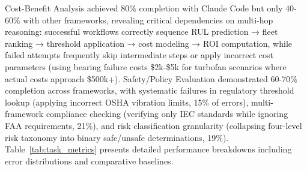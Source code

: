 \documentclass[sigconf,review]{acmart}
\begin{document}
  Cost-Benefit Analysis achieved 80\% completion with Claude Code but only 40-60\% with other frameworks, revealing critical dependencies on multi-hop reasoning:  
  successful workflows correctly sequence RUL prediction → fleet ranking →   
  threshold application → cost modeling → ROI computation, while failed      
  attempts frequently skip intermediate steps or apply incorrect cost        
  parameters (using bearing failure costs \$2k-\$5k for turbofan scenarios   
  where actual costs approach \$500k+). Safety/Policy Evaluation demonstrated
   60-70\% completion across frameworks, with systematic failures in         
  regulatory threshold lookup (applying incorrect OSHA vibration limits, 15\%
   of errors), multi-framework compliance checking (verifying only IEC       
  standards while ignoring FAA requirements, 21\%), and risk classification  
  granularity (collapsing four-level risk taxonomy into binary safe/unsafe   
  determinations, 19\%). Table~\ref{tab:task_metrics} presents detailed performance breakdowns including error distributions and comparative baselines.                                                                       
\end{document}
